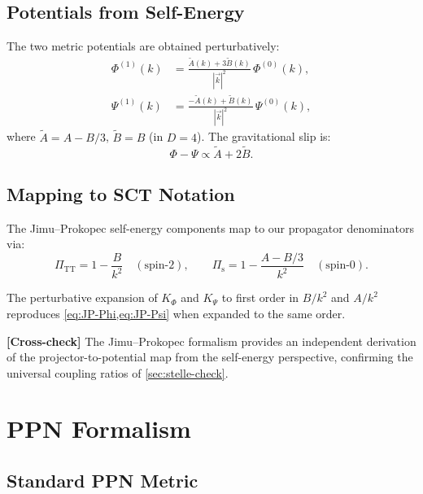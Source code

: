 \documentclass[11pt,a4paper]{article}
\theoremstyle{plain}
\theoremstyle{definition}
\theoremstyle{remark}
\newcommand{\crosscheck}[1]{%
  \par\smallskip\noindent
  \colorbox{blue!10}{\parbox{\dimexpr\linewidth-2\fboxsep}{%
    \textcolor{blue!50!black}{\textbf{[Cross-check]}} #1}}%
  \par\smallskip}
\begin{document}
\subsection{Potentials from Self-Energy}

The two metric potentials are obtained perturbatively:
\begin{align}
  \Phi^{(1)}(k) &= \frac{\tilde{A}(k) + 3\tilde{B}(k)}{|\vec{k}|^2}
    \,\Phi^{(0)}(k),
  \label{eq:JP-Phi}\\
  \Psi^{(1)}(k) &= \frac{-\tilde{A}(k) + \tilde{B}(k)}{|\vec{k}|^2}
    \,\Psi^{(0)}(k),
  \label{eq:JP-Psi}
\end{align}
where $\tilde{A} = A - B/3$, $\tilde{B} = B$ (in $D = 4$).
The gravitational slip is:
\begin{equation}\label{eq:slip}
  \Phi - \Psi \propto \tilde{A} + 2\tilde{B}.
\end{equation}

\subsection{Mapping to SCT Notation}

The Jimu--Prokopec self-energy components map to our propagator
denominators via:
\begin{equation}
  \Pi_{\mathrm{TT}} = 1 - \frac{B}{k^2}
  \quad (\text{spin-2}),
  \qquad
  \Pi_{\mathrm{s}} = 1 - \frac{A - B/3}{k^2}
  \quad (\text{spin-0}).
\end{equation}

The perturbative expansion of $K_\Phi$ and $K_\Psi$ to first
order in $B/k^2$ and $A/k^2$ reproduces \cref{eq:JP-Phi,eq:JP-Psi}
when expanded to the same order.

\crosscheck{The Jimu--Prokopec formalism provides an independent
derivation of the projector-to-potential map from the self-energy
perspective, confirming the universal coupling ratios of
\cref{sec:stelle-check}.}

\section{PPN Formalism}\label{sec:ppn-def}

\subsection{Standard PPN Metric}
\end{document}
